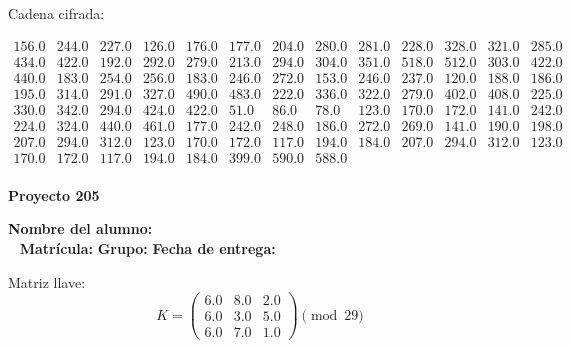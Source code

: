 \documentclass[12pt]{article}
\begin{document}
Cadena cifrada:
\begin{center}
$\begin{array}{lllllllllllll}
156.0 & 244.0 & 227.0 & 126.0 & 176.0 & 177.0 & 204.0 & 280.0 & 281.0 & 228.0 & 328.0 & 321.0 & 285.0\\
434.0 & 422.0 & 192.0 & 292.0 & 279.0 & 213.0 & 294.0 & 304.0 & 351.0 & 518.0 & 512.0 & 303.0 & 422.0\\
440.0 & 183.0 & 254.0 & 256.0 & 183.0 & 246.0 & 272.0 & 153.0 & 246.0 & 237.0 & 120.0 & 188.0 & 186.0\\
195.0 & 314.0 & 291.0 & 327.0 & 490.0 & 483.0 & 222.0 & 336.0 & 322.0 & 279.0 & 402.0 & 408.0 & 225.0\\
330.0 & 342.0 & 294.0 & 424.0 & 422.0 & 51.0 & 86.0 & 78.0 & 123.0 & 170.0 & 172.0 & 141.0 & 242.0\\
224.0 & 324.0 & 440.0 & 461.0 & 177.0 & 242.0 & 248.0 & 186.0 & 272.0 & 269.0 & 141.0 & 190.0 & 198.0\\
207.0 & 294.0 & 312.0 & 123.0 & 170.0 & 172.0 & 117.0 & 194.0 & 184.0 & 207.0 & 294.0 & 312.0 & 123.0\\
170.0 & 172.0 & 117.0 & 194.0 & 184.0 & 399.0 & 590.0 & 588.0\\
\end{array}$
\end{center}

\newpage


\textbf{Proyecto 205}

\textbf{Nombre del alumno:} \underline{\hspace{13cm}}\\\
\vspace{1cm}
\textbf{Matrícula:} \underline{\hspace{4cm}} \hspace{1cm}
\textbf{Grupo:} \underline{\hspace{2cm}}
\textbf{Fecha de entrega:} \underline{\hspace{2cm}}

\medskip

Matriz llave:
\[
K = \begin{pmatrix}
6.0 & 8.0 & 2.0\\
6.0 & 3.0 & 5.0\\
6.0 & 7.0 & 1.0
\end{pmatrix} \pmod{29}
\]
\end{document}
